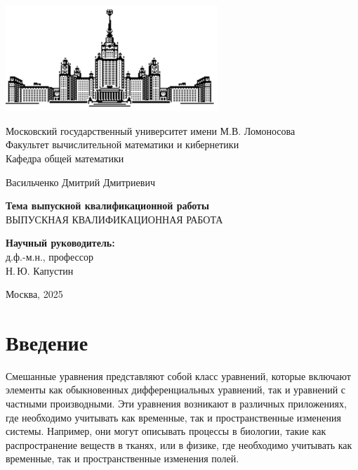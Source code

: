 \documentclass[12pt, a4paper]{article}
\begin{document}
\begin{titlepage}
\begin{center}
\includegraphics[width=8cm, height=4cm]{msu}
\end{center}
\begin{center}
Московский государственный университет имени М.В. Ломоносова\\
\vspace{0.1 cm}
Факультет вычислительной математики и кибернетики\\
\vspace{0.1 cm}
Кафедра общей математики

\vspace{3cm}
{\Large Васильченко Дмитрий Дмитриевич }\\
\vspace{1cm}

{\bf\LARGE Тема выпускной квалификационной работы}\\ \vspace{2cm}
ВЫПУСКНАЯ КВАЛИФИКАЦИОННАЯ РАБОТА

\end{center}
\vspace{2cm}
\begin{flushright}

{\bf Научный руководитель:}\\
д.ф.-м.н., профессор\\ 
Н.\,Ю. Капустин

\end{flushright}

 \vspace{4.0cm}

\centerline {Москва, 2025}

\end{titlepage}
\setcounter{page}{2}
\tableofcontents
\newpage
\section{Введение}
Смешанные уравнения представляют собой класс уравнений, которые включают элементы как обыкновенных дифференциальных уравнений, так и уравнений с частными производными. Эти уравнения возникают в различных приложениях, где необходимо учитывать как временные, так и пространственные изменения системы. Например, они могут описывать процессы в биологии, такие как распространение веществ в тканях, или в физике, где необходимо учитывать как временные, так и пространственные изменения полей.
\end{document}
